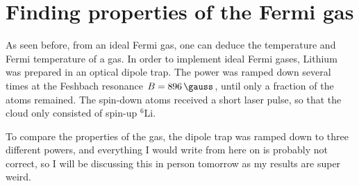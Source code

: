 	
\section{Finding properties of the Fermi gas}

As seen before, from an ideal Fermi gas, one can deduce the temperature and Fermi temperature of a gas.
In order to implement ideal Fermi gases, Lithium was prepared in an optical dipole trap. The power was ramped down several times at the Feshbach resonance $B=\SI{896}{\gauss}$, until only a fraction of the atoms remained. The spin-down atoms received a short laser pulse, so that the cloud only consisted of spin-up $^6$Li.

To compare the properties of the gas, the dipole trap was ramped down to three different powers, and everything I would write from here on is probably not correct, so I will be discussing this in person tomorrow as my results are super weird.

